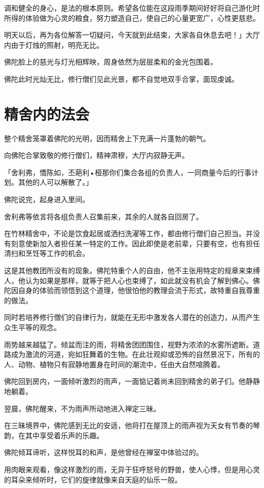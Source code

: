 \documentclass[twoside,openany]{book}
\begin{document}
调和健全的身心，是法的根本原则。希望各位能在这段雨季期间好好将自己游化时所得的体验做为心灵的粮食，努力塑造自己，使自己的心量更宽广，心性更慈悲。

明天以后，再为各位解答一切疑问，今天就到此结束，大家各自休息去吧！」大厅内由于灯烛的照射，明亮无比。

佛陀脸上的慈光与灯光相辉映，周身依然为层层柔和的金光包围着。

佛陀此时光灿无比，修行僧们见此光景，都不自觉地双手合掌，面现虔诚。

\section{精舍内的法会}\label{sec6.3}

整个精舍笼罩着佛陀的光明，因而精舍上下充满一片蓬勃的朝气。

向佛陀合掌致敬的修行僧们，精神肃穆，大厅内寂静无声。

「舍利弗，憍陈如，丕葩利•桠那你们集合各组的负责人，一同商量今后的行事计划。其他的人可以解散了。」

佛陀说完，起身进入里间。

舍利弗等依言将各组负责人召集前来，其余的人就各自回房了。

在竹林精舍中，不论是饮食起居或洒扫洗濯等工作，都由修行僧们自己担当。并没有刻意使新加入者担任某一特定的工作。因此即使是老前辈，只要有空，也有担任清扫和烹饪等工作的机会。

这是其他教团所没有的现象。佛陀特重个人的自由，他不主张用特定的规章来束缚人，他认为如果是那样，就等于把人心也束缚了，如此就没有机会了解到佛心。佛陀因自身的体验而领悟到这个道理，他很怕他的教理会流于形式，故特重自我尊重的做法。

同时若培养修行僧们的自律行为，就能在无形中激发各人潜在的创造力，从而产生众生平等的观念。

雨势越来越猛了。倾盆而注的雨，将精舍团团围住，视野为浓浓的水雾所遮断。道路成为激流的河道，宛如狂舞着的生物。在此壮观抑或恐怖的自然景况下，所有的人、动物、植物只有寂静地置身在时间的潮流中，任由大自然喧腾着。

佛陀回到房内，一面倾听激烈的雨声，一面惦记着尚未回到精舍的弟子们。他静静地躺着。

翌晨，佛陀醒来，不为雨声所动地进入禅定三昧。

在三昧境界中，佛陀感到无比的安适，他将打在屋顶上的雨声视为天女有节奏的琴韵，在其中享受着乐声的乐趣。

佛陀倾耳谛听，这样悦耳的和声，是他曾经在禅室中体验过的。

用肉眼来观看，像这样激烈的雨，无异于狂呼怒号的野兽，使人心悸，但是用心灵的耳朵来倾听时，它们的旋律就像来自天庭的仙乐一般。
\end{document}
